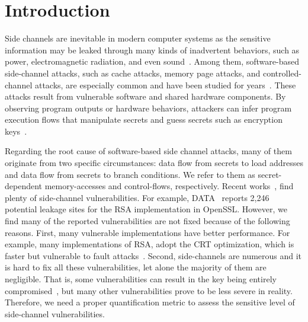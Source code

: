 \section{Introduction} 
Side channels are inevitable in modern computer systems as the sensitive
information may be leaked through many kinds of inadvertent behaviors, such as power,
electromagnetic radiation, and even
sound~\cite{agrawal2002side,kar20178,chari1999towards,217605,genkin2014rsa}.
Among them, software-based side-channel attacks, such as cache attacks, memory page
attacks, and controlled-channel attacks, are especially common and have been
studied for
years~\cite{7163052,217543,217589,lee2017inferring,191010,liu2015last}. These
attacks result from vulnerable software and shared hardware components.
By observing program outputs or hardware behaviors, attackers can infer program
execution flows that manipulate secrets and guess secrets such as encryption
keys~\cite{Osvik2006,Gullasch:2011:CGB:2006077.2006784,203878,10.1007/978-3-540-45238-6_6}.


Regarding the root cause of software-based side channel attacks, many of them originate
from two specific circumstances: data flow from secrets to load
addresses and data flow from secrets to branch conditions. We refer to them as
 secret-dependent memory-accesses and control-flows, respectively. 
Recent
works~\cite{203878,217537,Wichelmann:2018:MFF:3274694.3274741,Brotzman19Casym,236338,182946},
find plenty of side-channel vulnerabilities. For example,
DATA~\cite{217537} reports 2,246 potential leakage sites for the RSA
implementation in OpenSSL\@. 
However, we find many of the reported vulnerabilities are not fixed because
of the following reasons.
First, many vulnerable implementations have better performance. For example,
many implementations of RSA, adopt the CRT optimization,
which is faster but vulnerable to fault attacks~\cite{aumuller2002fault}.
Second, side-channels are numerous and it is hard to fix all these vulnerabilities,
let alone the majority of them are negligible. 
That is, some vulnerabilities can result in the key being 
entirely compromised~\cite{184415, aumuller2002fault}, but many other vulnerabilities prove to be less
severe in reality. Therefore, we need a proper quantification metric to 
assess the sensitive level of side-channel vulnerabilities.

